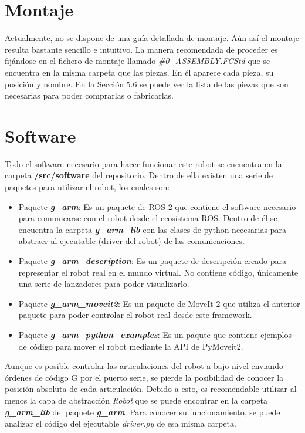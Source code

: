 \newpage
\section*{Montaje}
\noindent Actualmente, no se dispone de una guía detallada de montaje. Aún así el montaje resulta bastante sencillo 
e intuitivo. La manera recomendada de proceder es fijándose en el fichero de 
montaje llamado \textit{\#0\_ASSEMBLY.FCStd} que se encuentra en la misma carpeta que las piezas. En él 
aparece cada pieza, su posición y nombre. En la Sección 5.6 se puede ver la lista de las piezas que 
son necesarias para poder comprarlas o fabricarlas.

\section*{Software}
\noindent Todo el software necesario para hacer funcionar este robot se encuentra en la carpeta \textbf{/src/software} del repositorio. Dentro de 
ella existen una serie de paquetes para utilizar el robot, los cuales son:
\begin{itemize}
\item Paquete \textbf{\textit{g\_arm}}: Es un paquete de ROS 2 que contiene el software necesario para comunicarse con el robot desde el 
ecosistema ROS. Dentro de él se encuentra la carpeta \textbf{\textit{g\_arm\_lib}} con las clases de python necesarias para abstraer al 
ejecutable (driver del robot) de las comunicaciones.
\item Paquete \textbf{\textit{g\_arm\_description}}: Es un paquete de descripción creado para representar el robot real en el mundo virtual. No contiene código, únicamente una serie de lanzadores para poder visualizarlo.
\item Paquete \textbf{\textit{g\_arm\_moveit2}}: Es un paquete de MoveIt 2 que utiliza el anterior paquete para poder controlar el robot 
real desde este framework.
\item Paquete \textbf{\textit{g\_arm\_python\_examples}}: Es un paqute que contiene ejemplos de código para mover el robot mediante la API de PyMoveit2.
\end{itemize}

\begin{tcolorbox}[colback=blue!5!white,colframe=blue!75!black,title=Nota]
    Aunque es posible controlar las articulaciones del robot a bajo nivel enviando órdenes de código G por el puerto serie, se pierde la 
posibilidad de conocer la posición absoluta 
de cada articulación. Debido a esto, es recomendable utilizar al menos la capa de abstracción \textit{Robot} que se puede encontrar en 
la carpeta \textbf{\textit{g\_arm\_lib}} del paquete \textbf{\textit{g\_arm}}. Para conocer su funcionamiento, se puede analizar el código del ejecutable 
\textit{driver.py} de esa misma carpeta. 
\end{tcolorbox}


